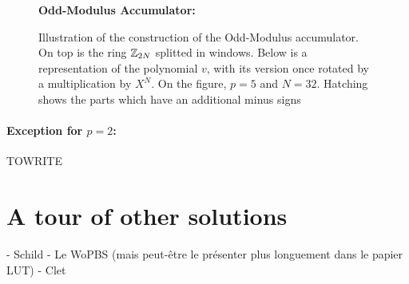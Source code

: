 \begin{figure}[H]
	\centering
	
	\vspace{1.5em}
%	
	\textbf{Odd-Modulus Accumulator:}\\[0.5em]
%	
	\caption{Illustration of the construction of the Odd-Modulus accumulator. On top is the ring $\mathbb{Z}_{2N}$ splitted in windows. Below is a representation of the polynomial $v$, with its version once rotated by a multiplication by $X^N$. On the figure, $p = 5$ and $N = 32$. Hatching shows the parts which have an additional minus signs}
	\label{fig:accumulator_odd}
\end{figure}







\paragraph{Exception for $p=2$:} TOWRITE






\section{A tour of other solutions}
\label{sec:soa_against_negacyclicity}

- Schild
- Le WoPBS (mais peut-être le présenter plus longuement dans le papier LUT)
- Clet





